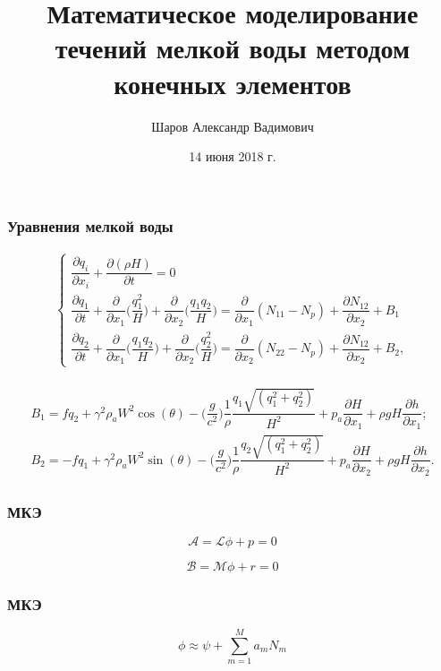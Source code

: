 \documentclass[10pt,utf8,presentation,compress]{beamer}
\title[Мат. моделирование течений мелкой воды с помощью МКЭ]{Математическое моделирование течений мелкой воды методом конечных элементов}
\author[Шаров Александр Вадимович]{Шаров Александр Вадимович}
\institute[НИУ СГУ имени Н.Г.Чернышевского]{Саратовский национальный исследовательский \\ государственный университет \\ им. Н.Г.Чернышевского}
\date{14 июня 2018 г.}
\begin{document}
\frame[plain]{\titlepage}

\begin{frame}
\frametitle{Уравнения мелкой воды}
	\begin{eqnarray*}
	\begin{cases}
		\dfrac{ \partial q_i}{\partial x_i} + \dfrac{\partial(\rho H)}{\partial t} = 0 \\
		\dfrac{\partial q_1}{\partial t} + \dfrac{\partial}{\partial x_1} \bigg(\dfrac{q_1^2}{H}\bigg)+\dfrac{\partial }{\partial x_2}\bigg(\dfrac{q_1 q_2}{H}\bigg) = \dfrac{\partial}{\partial x_1} (N_{11}-N_p) + \dfrac{\partial N_{12}}{\partial x_2} + B_1 \\
		\dfrac{\partial q_2}{\partial t} + \dfrac{\partial}{\partial x_1} \bigg(\dfrac{q_1 q_2}{H}\bigg)+\dfrac{\partial }{\partial x_2}\bigg(\dfrac{q_2^2}{H}\bigg) = \dfrac{\partial}{\partial x_2} (N_{22}-N_p) + \dfrac{\partial N_{12}}{\partial x_2} + B_2,
	\end{cases}
	\end{eqnarray*}

	\begin{eqnarray*}
	\begin{aligned}
		B_1=fq_2+\gamma^2\rho_aW^2\cos(\theta)-\bigg(\dfrac{g}{c^2}\bigg)\dfrac{1}{\rho}\dfrac{q_1\sqrt{(q_1^2+q_2^2)}}{H^2} + p_a \dfrac{\partial H}{\partial x_1} + \rho gH\dfrac{\partial h}{\partial x_1}; \\
		B_2=-fq_1+\gamma^2\rho_aW^2\sin(\theta)-\bigg(\dfrac{g}{c^2}\bigg)\dfrac{1}{\rho}\dfrac{q_2\sqrt{(q_1^2+q_2^2)}}{H^2} + p_a \dfrac{\partial H}{\partial x_2} + \rho gH\dfrac{\partial h}{\partial x_2}.
	\end{aligned}
	\end{eqnarray*}
\end{frame}


\begin{frame}
\frametitle{МКЭ}
	\begin{equation}\label{eq:1}
		\mathcal A = \mathcal L\phi + p = 0
	\end{equation}

	\begin{equation}\label{eq:2}
		\mathcal B = \mathcal M \phi+r=0
	\end{equation}
\end{frame}

\begin{frame}
\frametitle{МКЭ}
	\begin{equation}\label{eq:3}
		\phi \approx \psi + \sum\limits_{m=1}^{M} a_mN_m
	\end{equation}
\end{frame}
\end{document}
